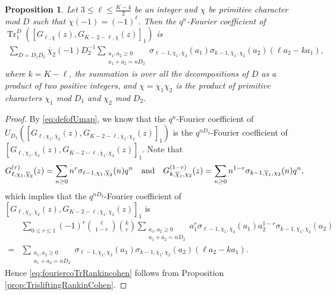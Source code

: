 \documentclass[11pt,letterpaper,reqno]{amsart}
\newcommand\ques[1]{\textcolor{blue}{\textbf{Question}: #1}}
\numberwithin{figure}{section}
\numberwithin{table}{section}
\theoremstyle{definition}
\theoremstyle{plain}
\newtheorem{proposition}[theorem]{Proposition}
\theoremstyle{definition}
\theoremstyle{definition}
\theoremstyle{remark}
\numberwithin{equation}{section}
\theoremstyle{remark}
\DeclareMathOperator{\Tr}{Tr}
\begin{document}
\begin{proposition}\label{prop:FourcoRankinCohen}
   Let $3\leq \ell\leq\frac{K-4}{2}$ be an integer 
   and  $\chi$ be primitive character mod $D$ such that $\chi(-1)=(-1)^{\ell}$. Then the $q^n$-Fourier coefficient of $ \Tr^D_1([G_{\ell,\chi}(z),G_{K-2-\ell,\overline{\chi}}(z)]_1)$ is 
    \begin{align}
\sum_{D=D_1D_2}\overline{\chi}_2(-1)D_2^{-1}\sum_{\substack{a_1,a_2\geq0\\a_1+a_2=nD_2}}\sigma_{\ell-1,\chi_1,\overline{\chi}_{2}}(a_1)\sigma_{k-1,\overline{\chi}_{1},\chi_2}(a_2)(\ell a_2-k a_1),\label{eq:fouriercoTrRankincohen}
    \end{align}
    where $k=K-\ell$, the summation is over all the decompositions of $D$ as a product of two positive integers, and $\chi=\chi_1\chi_2$ is the product of primitive characters $\chi_1$ mod $D_1$ and $\chi_2$ mod $D_2$.
\end{proposition}
\begin{proof}
By \eqref{eq:defofUmap}, we know that the $q^n$-Fourier coefficient of $U_{D_2}\left([G_{\ell,\chi_1,\overline{\chi}_{2}}(z),G_{K-2-\ell,\overline{\chi}_{1},\chi_2}(z)]_1\right)$ is the $q^{nD_2}$-Fourier coefficient of $[G_{\ell,\chi_1,\overline{\chi}_{2}}(z),G_{K-2-\ell,\overline{\chi}_{1},\chi_2}(z)]_1$. 
Note that 
\begin{align*}
    G_{\ell,\chi_1,\overline{\chi}_2}^{(r)}(z)=\sum_{n\geq0}n^r\sigma_{\ell-1,\chi_1,\overline{\chi}_2}(n)q^n \quad{\rm and}\quad  G_{k,\overline{\chi}_1,\chi_2}^{(1-r)}(z)=\sum_{n\geq0}n^{1-r}\sigma_{k-1,\overline{\chi}_1,\chi_2}(n)q^n, 
\end{align*}
which implies that the $q^{nD_2}$-Fourier coefficient of $[G_{\ell,\chi_1,\overline{\chi}_{2}}(z),G_{K-2-\ell,\overline{\chi}_{1},\chi_2}(z)]_1$ is 
\begin{align*}
&\sum_{0\leq r\leq1}(-1)^r\binom{\ell}{1-r}\binom{k}{r}\sum_{\substack{a_1,a_2\geq0\\a_1+a_2=nD_2}}a_1^r\sigma_{\ell-1,\chi_1,\overline{\chi}_2}(a_1)a_2^{1-r}\sigma_{k-1,\overline{\chi}_1,\chi_2}(a_2)\\=&\sum_{\substack{a_1,a_2\geq0\\a_1+a_2=nD_2}}\sigma_{\ell-1,\chi_1,\overline{\chi}_{2}}(a_1)\sigma_{k-1,\overline{\chi}_{1},\chi_2}(a_2)(\ell a_2-k a_1).
\end{align*}
Hence \eqref{eq:fouriercoTrRankincohen} follows from Proposition \ref{prop:TrisliftingRankinCohen}.
\end{proof}
\end{document}
